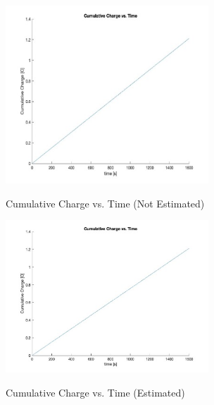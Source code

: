 \begin{figure}
    \begin{center}
    \includegraphics[width=3in]{fig9.jpg}
    \end{center}
    \renewcommand{\baselinestretch}{1}
    \small\normalsize
    \begin{quote}
    \caption[Cumulative Charge vs. Time (Not Estimated)]{Cumulative Charge vs. Time (Not Estimated)} \label{fig: f9}
    \end{quote}
\end{figure}

\begin{figure}
    \begin{center}
    \includegraphics[width=3in]{fig10.jpg}
    \end{center}
    \renewcommand{\baselinestretch}{1}
    \small\normalsize
    \begin{quote}
    \caption[Cumulative Charge vs. Time (Estimated)]{Cumulative Charge vs. Time (Estimated)} \label{fig: f10}
    \end{quote}
\end{figure}


